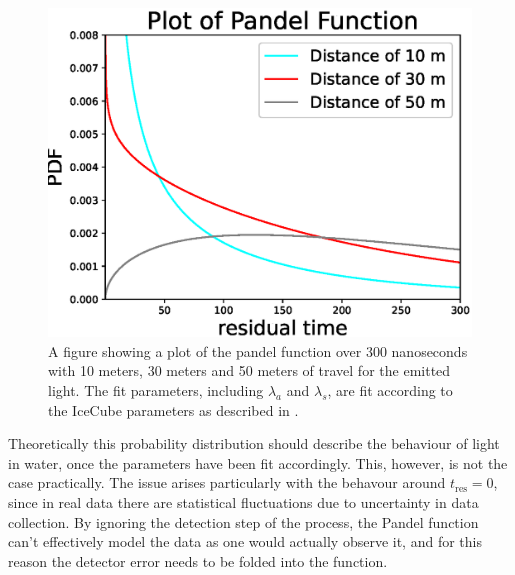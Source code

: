 \begin{figure}[H]
  \centering
  \includegraphics[width=12cm]{./Figures/pandel_plot.eps}
  \caption{A figure showing a plot of the pandel function over 300 nanoseconds with 10 meters, 30 meters and 50 meters of travel for the emitted light. The fit parameters, including $\lambda_{a}$ and $\lambda_{s}$, are fit according to the IceCube parameters as described in \cite{phd_kai}. }
  \label{fig:pandel}
\end{figure}

Theoretically this probability distribution should describe the behaviour of light in water, once the parameters have been fit accordingly. This, however, is not the case practically. The issue arises particularly with the behavour around $t_{\text{res}} = 0$, since in real data there are statistical fluctuations due to uncertainty in data collection. By ignoring the detection step of the process, the Pandel function can't effectively model the data as one would actually observe it, and for this reason the detector error needs to be folded into the function.

